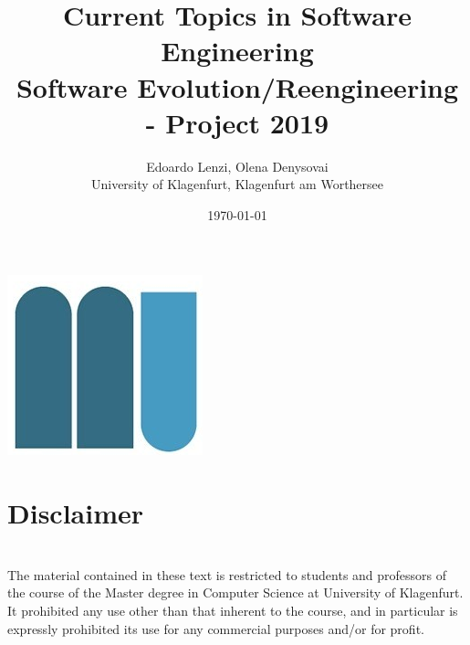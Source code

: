 \documentclass{memoir}
\title{
    Current Topics in Software Engineering\\[2pt] 
    \small{Software Evolution/Reengineering - Project 2019}}
\author{Edoardo Lenzi, Olena Denysovai\\ University of Klagenfurt, Klagenfurt am Worthersee}
\date{\today}
\begin{document}
\maketitle
\begin{center}
    \includegraphics[scale=0.5]{assets/klagenfurt.png}
\end{center}


\newpage
\tableofcontents
\newpage







%




\chapter*{Disclaimer}
$ $\\[10pt]
The material contained in these text is restricted to students and professors of the course of the Master degree in 
Computer Science at University of Klagenfurt.\\ 
      
It prohibited any use other than that inherent to the course, and in particular is expressly prohibited its use for any 
commercial purposes and/or for profit.
\end{document}
